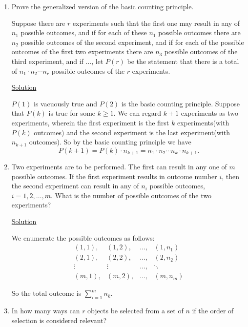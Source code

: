 \begin{enumerate}
\item Prove the generalized version of the basic counting principle.

Suppose there are $r$ experiments such that the first one may result in any of
$n_1$ possible outcomes, and if for each of these $n_1$ possible outcomes there
are $n_2$ possible outcomes of the second experiment, and if for each of the
possible outcomes of the first two experiments there are $n_3$ possible outcomes
of the third experiment, and if $\ldots$, let $P(r)$ be the statement that
there is a total of $n_1 \cdot n_2 \cdots n_r$ possible outcomes of the $r$
experiments.

\underline{Solution}

$P(1)$ is vacuously true and $P(2)$ is the basic counting principle. Suppose
that $P(k)$ is true for some $k \ge 1$. We can regard $k + 1$ experiments as
two experiments, wherein the first experiment is the first $k$
experiments(with $P(k)$ outcomes) and the second experiment is the last
experiment(with $n_{k + 1}$ outcomes). So by the basic counting principle we
have
\[P(k + 1) = P(k) \cdot n_{k + 1} = n_1 \cdot n_2 \cdots n_k \cdot n_{k + 1}.\]

\item Two experiments are to be performed. The first can result in any one of
$m$ possible outcomes. If the first experiment results in outcome number $i$,
then the second experiment can result in any of $n_i$ possible outcomes,
$i = 1, 2, \ldots, m$. What is the number of possible outcomes of the two
experiments?

\underline{Solution}

We enumerate the possible outcomes as follows:
\begin{equation*}
\begin{array}{cccc}
(1, 1), & (1, 2), & \ldots, & (1, n_1) \\
(2, 1), & (2, 2), & \ldots, & (2, n_2) \\
\vdots & \vdots & \ldots, & \ddots \\
(m, 1), & (m, 2), & \ldots, & (m, n_m)
\end{array}
\end{equation*}

So the total outcome is $\sum_{i=1}^mn_k$.

\item In how many ways can $r$ objects be selected from a set of $n$ if the
order of selection is considered relevant?


\end{enumerate}
